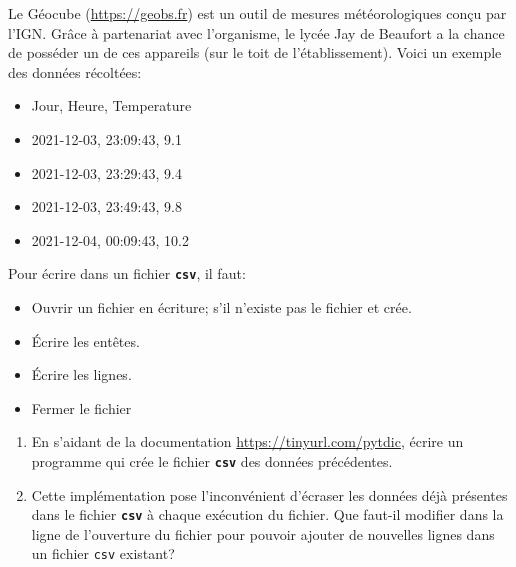\documentclass[a4paper,11pt]{article}
\begin{document}
\begin{exo}
    Le Géocube (\url{https://geobs.fr}) est un outil de mesures météorologiques conçu par l'IGN. Grâce à partenariat avec l'organisme, le lycée Jay de Beaufort a la chance de posséder un de ces appareils (sur le toit de l'établissement). Voici un exemple des données récoltées:
    \begin{itemize}
        \item Jour, Heure, Temperature
        \item 2021-12-03, 23:09:43, 9.1
        \item 2021-12-03, 23:29:43, 9.4
        \item 2021-12-03, 23:49:43, 9.8
        \item 2021-12-04, 00:09:43, 10.2
    \end{itemize}
    Pour écrire dans un fichier \textbf{\texttt{csv}}, il faut:
    \begin{itemize}
        \item Ouvrir un fichier en écriture; s'il n'existe pas le fichier et crée.
        \item Écrire les entêtes.
        \item Écrire les lignes.
        \item Fermer le fichier
    \end{itemize}
    \begin{enumerate}
        \item En s'aidant de la documentation \url{https://tinyurl.com/pytdic}, écrire un programme qui crée le fichier \textbf{\texttt{csv}} des données précédentes.
        \item Cette implémentation pose l'inconvénient d'écraser les données déjà présentes dans le fichier \textbf{\texttt{csv}} à chaque exécution du fichier. Que faut-il modifier dans la ligne de l'ouverture du fichier pour pouvoir ajouter de nouvelles lignes dans un fichier \texttt{csv} existant?
    \end{enumerate}
\end{exo}
\end{document}
